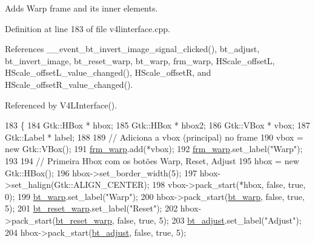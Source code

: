 Adds Warp frame and its inner elements. 



Definition at line 183 of file v4linterface.\+cpp.



References \+\_\+\+\_\+event\+\_\+bt\+\_\+invert\+\_\+image\+\_\+signal\+\_\+clicked(), bt\+\_\+adjust, bt\+\_\+invert\+\_\+image, bt\+\_\+reset\+\_\+warp, bt\+\_\+warp, frm\+\_\+warp, H\+Scale\+\_\+offsetL, H\+Scale\+\_\+offset\+L\+\_\+value\+\_\+changed(), H\+Scale\+\_\+offsetR, and H\+Scale\+\_\+offset\+R\+\_\+value\+\_\+changed().



Referenced by V4\+L\+Interface().


\begin{DoxyCode}
183                                          \{
184         Gtk::HBox * hbox;
185         Gtk::HBox * hbox2;
186         Gtk::VBox * vbox;
187         Gtk::Label * label;
188 
189         \textcolor{comment}{// Adiciona a vbox (principal) no frame}
190         vbox = \textcolor{keyword}{new} Gtk::VBox();
191         \hyperlink{class_v_s_s_s___g_u_i_1_1_v4_l_interface_af5db2099d80d5ef2fcc1d97417e6ce72}{frm\_warp}.add(*vbox);
192         \hyperlink{class_v_s_s_s___g_u_i_1_1_v4_l_interface_af5db2099d80d5ef2fcc1d97417e6ce72}{frm\_warp}.set\_label(\textcolor{stringliteral}{"Warp"});
193 
194         \textcolor{comment}{// Primeira Hbox com os botões Warp, Reset, Adjust}
195         hbox = \textcolor{keyword}{new} Gtk::HBox();
196         hbox->set\_border\_width(5);
197         hbox->set\_halign(Gtk::ALIGN\_CENTER);
198         vbox->pack\_start(*hbox, \textcolor{keyword}{false}, \textcolor{keyword}{true}, 0);
199         \hyperlink{class_v_s_s_s___g_u_i_1_1_v4_l_interface_a6cdcc092c26848cd7009e56084ee1b23}{bt\_warp}.set\_label(\textcolor{stringliteral}{"Warp"});
200         hbox->pack\_start(\hyperlink{class_v_s_s_s___g_u_i_1_1_v4_l_interface_a6cdcc092c26848cd7009e56084ee1b23}{bt\_warp}, \textcolor{keyword}{false}, \textcolor{keyword}{true}, 5);
201         \hyperlink{class_v_s_s_s___g_u_i_1_1_v4_l_interface_af7e670a295f186a699859a285ea1cdbb}{bt\_reset\_warp}.set\_label(\textcolor{stringliteral}{"Reset"});
202         hbox->pack\_start(\hyperlink{class_v_s_s_s___g_u_i_1_1_v4_l_interface_af7e670a295f186a699859a285ea1cdbb}{bt\_reset\_warp}, \textcolor{keyword}{false}, \textcolor{keyword}{true}, 5);
203         \hyperlink{class_v_s_s_s___g_u_i_1_1_v4_l_interface_a0d17ffdc7f7792c2d37bcda12c700133}{bt\_adjust}.set\_label(\textcolor{stringliteral}{"Adjust"});
204         hbox->pack\_start(\hyperlink{class_v_s_s_s___g_u_i_1_1_v4_l_interface_a0d17ffdc7f7792c2d37bcda12c700133}{bt\_adjust}, \textcolor{keyword}{false}, \textcolor{keyword}{true}, 5);

\end{DoxyCode}
